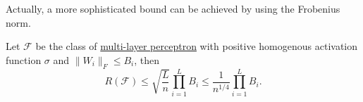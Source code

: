 Actually, a more sophisticated bound can be achieved by using the Frobenius norm.

\begin{theorem}
	Let \(\mathscr{F} \) be the class of \hyperref[def:MLP]{multi-layer perceptron} with positive homogenous activation function \(\sigma\) and \(\lVert W_i \rVert _F \leq B_i\), then
	\[
		R(\mathscr{F} ) \leq \sqrt{\frac{L}{n}} \prod _{i=1}^{L} B_i \leq \frac{1}{n^{1 / 4}} \prod _{i=1}^{L} B_i .
	\]
\end{theorem}